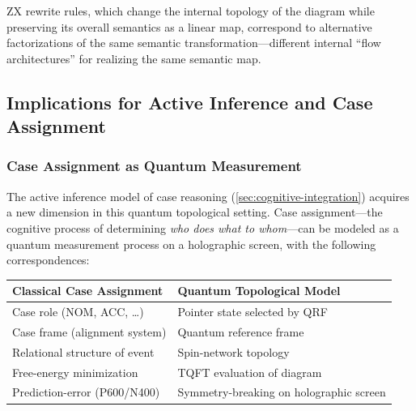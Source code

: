 \documentclass[
]{article}
\newcounter{none} %
\numberwithin{equation}{section}
\begin{document}
ZX rewrite rules, which change the internal topology of the diagram
while preserving its overall semantics as a linear map, correspond to
alternative factorizations of the same semantic
transformation---different internal ``flow architectures'' for realizing
the same semantic map.

\subsection{Implications for Active Inference and Case
Assignment}\label{implications-for-active-inference-and-case-assignment}

\subsubsection{Case Assignment as Quantum
Measurement}\label{case-assignment-as-quantum-measurement}

The active inference model of case reasoning
(\autoref{sec:cognitive-integration}) acquires a new dimension in this
quantum topological setting. Case assignment---the cognitive process of
determining \emph{who does what to whom}---can be modeled as a quantum
measurement process on a holographic screen, with the following
correspondences:

{\def\LTcaptype{none} %
\begin{longtable}[]{@{}
  >{\raggedright\arraybackslash}p{}
  >{\raggedright\arraybackslash}p{}@{}}
\toprule\noalign{}
\begin{minipage}[b]{\linewidth}\raggedright
Classical Case Assignment
\end{minipage} & \begin{minipage}[b]{\linewidth}\raggedright
Quantum Topological Model
\end{minipage} \\
\midrule\noalign{}
\endhead
\bottomrule\noalign{}
\endlastfoot
Case role (NOM, ACC, \ldots) & Pointer state selected by QRF \\
Case frame (alignment system) & Quantum reference frame \\
Relational structure of event & Spin-network topology \\
Free-energy minimization & TQFT evaluation of diagram \\
Prediction-error (P600/N400) & Symmetry-breaking on holographic
screen \\
\end{longtable}
}
\end{document}
